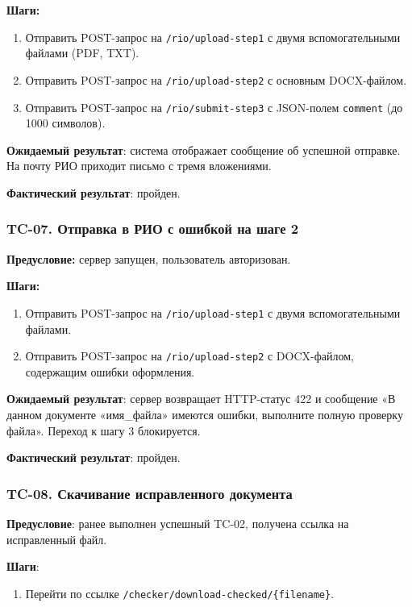 \textbf{Шаги:}
\begin{enumerate}
	\item Отправить POST-запрос на \texttt{/rio/upload-step1} с двумя вспомогательными файлами (PDF, TXT).
	\item Отправить POST-запрос на \texttt{/rio/upload-step2} с основным DOCX-файлом.
	\item Отправить POST-запрос на \texttt{/rio/submit-step3} с JSON-полем \texttt{comment} (до 1000 символов).
\end{enumerate}

\textbf{Ожидаемый результат}: система отображает сообщение об успешной отправке. На почту РИО приходит письмо с тремя вложениями.

\textbf{Фактический результат}: пройден.

\subsubsection{TC-07. Отправка в РИО с ошибкой на шаге 2}

\textbf{Предусловие:} сервер запущен, пользователь авторизован.

\textbf{Шаги:}
\begin{enumerate}
	\item Отправить POST-запрос на \texttt{/rio/upload-step1} с двумя вспомогательными файлами.
	\item Отправить POST-запрос на \texttt{/rio/upload-step2} с DOCX-файлом, содержащим ошибки оформления.
\end{enumerate}

\textbf{Ожидаемый результат}: сервер возвращает HTTP-статус 422 и сообщение «В данном документе «имя\_файла» имеются ошибки, выполните полную проверку файла». Переход к шагу 3 блокируется.

\textbf{Фактический результат}: пройден.

\subsubsection{TC-08. Скачивание исправленного документа}

\textbf{Предусловие}: ранее выполнен успешный TC-02, получена ссылка на исправленный файл.

\textbf{Шаги}:
\begin{enumerate}
	\item Перейти по ссылке \texttt{/checker/download-checked/\{filename\}}.
\end{enumerate}

